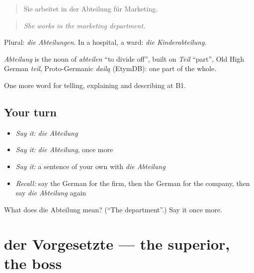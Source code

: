 \begin{quote}
Sie arbeitet in der Abteilung für Marketing.
\end{quote}

\begin{quote}
\emph{She works in the marketing department.}
\end{quote}

Plural: \emph{die Abteilungen}. In a hospital, a ward: \emph{die Kinderabteilung}.

\begin{cousinweb}
\emph{Abteilung} is the noun of \emph{abteilen} \textquotedblleft{}to divide off\textquotedblright{}, built on \emph{Teil} \textquotedblleft{}part\textquotedblright{}, Old High German \emph{teil}, Proto-Germanic \emph{dailą} (EtymDB): one part of the whole.
\end{cousinweb}

\begin{grammarlens}[title={What you've built}]
One more word for telling, explaining and describing at B1.
\end{grammarlens}

\subsection*{Your turn}
\begin{itemize}
\raggedright
  \item \emph{Say it:} \emph{die Abteilung}
  \item \emph{Say it:} \emph{die Abteilung}, once more
  \item \emph{Say it:} a sentence of your own with \emph{die Abteilung}
  \item \emph{Recall:} say the German for the firm, then the German for the company, then say \emph{die Abteilung} again
\end{itemize}

\begin{tcolorbox}[breakable,colback=teal!4,colframe=teal!35!black,title={Before you move on}]
What does die Abteilung mean? (\textquotedblleft{}The department\textquotedblright{}.) Say it once more.
\end{tcolorbox}
\section[der Vorgesetzte]{der Vorgesetzte — the superior, the boss}

\label{lesson:GE-C353-vorgesetzte}



